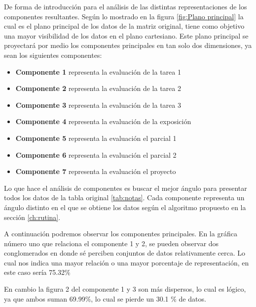 De forma de introducción para el análisis de las distintas representaciones de los componentes resultantes. Según lo mostrado en la figura \ref{fig:Plano principal} la cual es el plano principal de los datos de la matriz original, tiene como objetivo una mayor visibilidad de los datos en el plano cartesiano. Este plano principal se proyectará por medio los componentes principales en tan solo dos dimensiones, ya sean los siguientes componentes:


\begin{itemize}
    \item \textbf{Componente 1} representa la evaluación de la tarea 1
    \item \textbf{Componente 2} representa la evaluación de la tarea 2
    \item \textbf{Componente 3} representa la evaluación de la tarea 3
    \item \textbf{Componente 4} representa la evaluación de la exposición
    \item \textbf{Componente 5} representa la evaluación el parcial 1
    \item \textbf{Componente 6} representa la evaluación el parcial 2 
    \item \textbf{Componente 7} representa la evaluación el proyecto
\end{itemize}


Lo que hace el análisis de componentes es buscar el mejor ángulo para presentar todos los datos de la tabla original \ref{tab:notas}. Cada componente representa un ángulo distinto en el que se obtiene los datos según el algoritmo propuesto en la sección \ref{ch:rutina}. 


A continuación podremos observar los componentes principales.
En la gráfica número uno que relaciona el componente 1 y 2, se pueden observar dos conglomerados en donde sé perciben conjuntos de datos relativamente cerca. Lo cual nos indica una mayor relación o una mayor porcentaje de representación, en este caso sería 75.32\% 

En cambio la figura 2 del componente 1 y 3 son más dispersos, lo cual es lógico, ya que ambos suman 69.99\%, lo cual se pierde un 30.1 \%  de datos.

